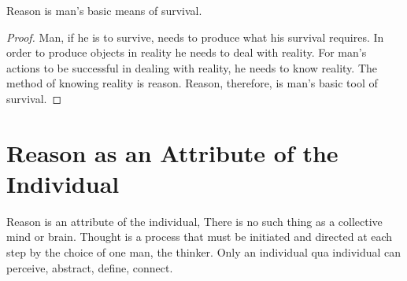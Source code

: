             \begin{theorem}
                Reason is man's basic means of survival.
            \end{theorem}

            \begin{proof}
                Man, if he is to survive, needs to produce what his survival requires. In order to produce objects in reality he needs to deal with reality. For man's actions to be successful in dealing with reality, he needs to know reality. The method of knowing reality is reason. Reason, therefore, is man's basic tool of survival.
            \end{proof}


    \section{Reason as an Attribute of the Individual}

        Reason is an attribute of the individual, There is no such thing as a collective mind or brain. Thought is a process that must be initiated and directed at each step by the choice of one man, the thinker. Only an individual qua individual can perceive, abstract, define, connect.